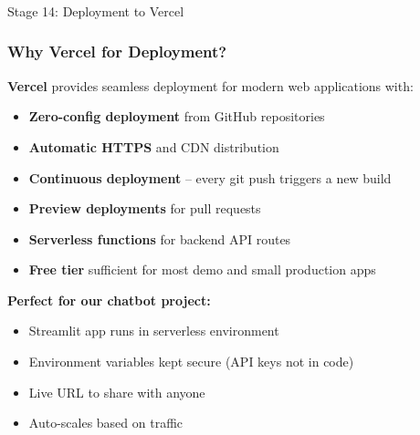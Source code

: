 \begin{frame}[fragile]\frametitle{}
\begin{center}
{\Large Stage 14: Deployment to Vercel}
\end{center}
\end{frame}


\begin{frame}[fragile]\frametitle{Why Vercel for Deployment?}
\textbf{Vercel} provides seamless deployment for modern web applications with:
  \begin{itemize}
    \item \textbf{Zero-config deployment} from GitHub repositories
    \item \textbf{Automatic HTTPS} and CDN distribution
    \item \textbf{Continuous deployment} -- every git push triggers a new build
    \item \textbf{Preview deployments} for pull requests
    \item \textbf{Serverless functions} for backend API routes
    \item \textbf{Free tier} sufficient for most demo and small production apps
  \end{itemize}

\textbf{Perfect for our chatbot project:}
  \begin{itemize}
    \item Streamlit app runs in serverless environment
    \item Environment variables kept secure (API keys not in code)
    \item Live URL to share with anyone
    \item Auto-scales based on traffic
  \end{itemize}
\end{frame}


